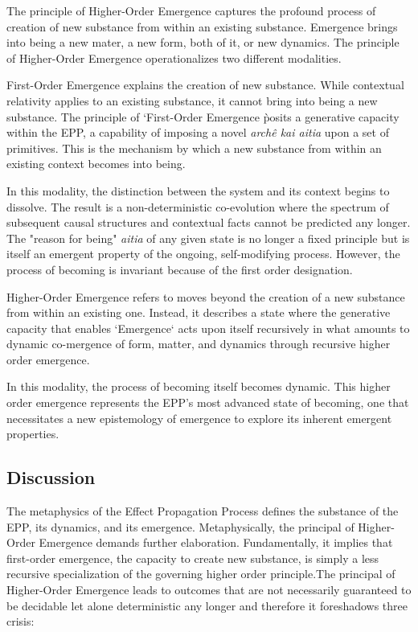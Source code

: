 The principle of Higher-Order Emergence captures the profound process of creation of new substance from within an existing substance. 
Emergence brings into being a new mater, a new form, both of it, or new dynamics. The principle of Higher-Order Emergence operationalizes two different modalities.  

First-Order Emergence explains the creation of new substance. While contextual relativity applies to an existing substance, it cannot bring into being a new substance. The principle of `First-Order Emergence \` posits a generative capacity within the EPP, a capability of imposing a novel \textit{archê kai aitia} upon a set of primitives. This is the mechanism by which a new substance from within an existing context becomes into being.

In this modality, the distinction between the system and its context begins to dissolve. The result is a non-deterministic co-evolution where the spectrum of subsequent causal structures and contextual facts cannot be predicted any longer. The "reason for being" \textit{aitia} of any given state is no longer a fixed principle but is itself an emergent property of the ongoing, self-modifying process. However, the process of becoming is invariant because of the first order designation. 

Higher-Order Emergence refers to moves beyond the creation of a new substance from within an existing one. Instead, it describes a state where the generative capacity that enables `Emergence` acts upon itself recursively in what amounts to  dynamic co-mergence of form, matter, and dynamics through recursive higher order emergence. 

In this modality, the process of becoming itself becomes dynamic. This higher order emergence represents the EPP's most advanced state of becoming, one that necessitates a new epistemology of emergence to explore its inherent emergent properties.

\newpage

\subsection{Discussion}
\label{sec:metaphysics_discussion}

The metaphysics of the Effect Propagation Process defines the substance of the EPP, its dynamics, 
and its emergence.  Metaphysically, the principal of Higher-Order Emergence demands further elaboration. 
Fundamentally, it implies that first-order emergence, the capacity to create new substance, is simply a less recursive specialization of the governing higher order principle.The principal of Higher-Order Emergence leads to outcomes that are not necessarily guaranteed to be decidable let alone deterministic any longer
and therefore it foreshadows three crisis:


